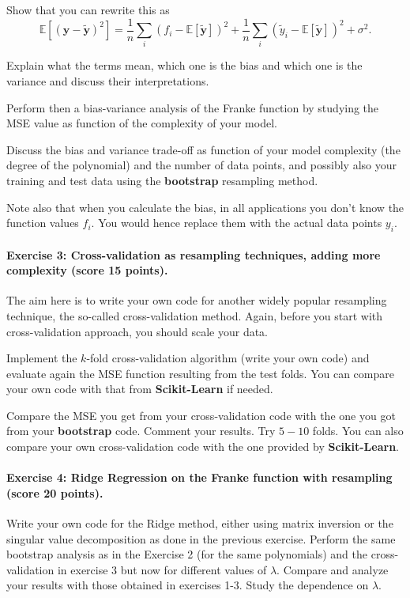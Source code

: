 \documentclass[%
oneside,                 %
final,                   %
10pt]{article}
\begin{document}
Show that you can rewrite  this as
\[
\mathbb{E}\left[(\bm{y}-\bm{\tilde{y}})^2\right]=\frac{1}{n}\sum_i(f_i-\mathbb{E}\left[\bm{\tilde{y}}\right])^2+\frac{1}{n}\sum_i(\tilde{y}_i-\mathbb{E}\left[\bm{\tilde{y}}\right])^2+\sigma^2.
\]

Explain what the terms mean, which one is the bias and which one is
the variance and discuss their interpretations.

Perform then a bias-variance analysis of the Franke function by
studying the MSE value as function of the complexity of your model.

Discuss the bias and variance trade-off as function
of your model complexity (the degree of the polynomial) and the number
of data points, and possibly also your training and test data using the \textbf{bootstrap} resampling method.

Note also that when you calculate the bias, in all applications you don't know the function values $f_i$. You would hence replace them with the actual data points $y_i$.


\paragraph{Exercise 3:  Cross-validation as resampling techniques, adding more complexity (score 15 points).}
The aim here is to write your own code for another widely popular
resampling technique, the so-called cross-validation method.  Again,
before you start with cross-validation approach, you should scale your
data.

Implement the $k$-fold cross-validation algorithm (write your own
code) and evaluate again the MSE function resulting
from the test folds. You can compare your own code with that from
\textbf{Scikit-Learn} if needed. 

Compare the MSE you get from your cross-validation code with the one
you got from your \textbf{bootstrap} code. Comment your results. Try $5-10$
folds.  You can also compare your own cross-validation code with the
one provided by \textbf{Scikit-Learn}.


\paragraph{Exercise 4: Ridge Regression on the Franke function  with resampling (score 20 points).}
Write your own code for the Ridge method, either using matrix
inversion or the singular value decomposition as done in the previous
exercise. Perform the same bootstrap analysis as in the
Exercise 2  (for the same polynomials) and the cross-validation  in exercise 3 but now for different values of $\lambda$. Compare and
analyze your results with those obtained in exercises 1-3. Study the
dependence on $\lambda$.
\end{document}
